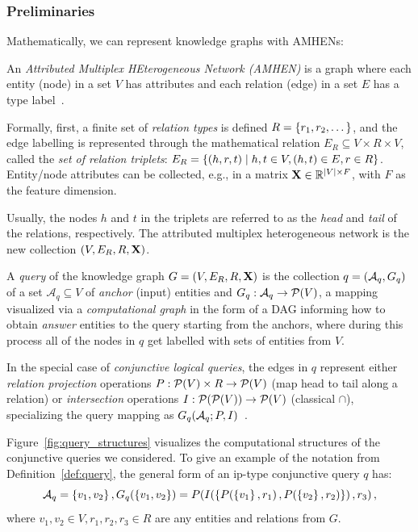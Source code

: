 \subsubsection{Preliminaries}

Mathematically, we can represent knowledge graphs with AMHENs:
\begin{definition}
An \emph{Attributed Multiplex HEterogeneous Network (AMHEN)} is a graph where each entity (node) in a set $V$ has attributes and each relation (edge) in a set $E$ has a type label~\cite{liu_ahng_2019,cen_representation_2019}. 

Formally, first, a finite set of \emph{relation types} is defined $R = \mathopen{}\left\{r_1,r_2,\dots\right\}$, and the edge labelling is represented through the mathematical relation $E_R \subseteq V \times R \times V$, called the \emph{set of relation triplets}:  $E_R = \mathopen{}\left\{\mathopen{}\left(h,r,t\right) \mid h,t \in V, \mathopen{}\left(h,t\right) \in E, r \in R\right\}$. Entity/node attributes can be collected, e.g., in a matrix $\mathbf{X} \in \mathbb{R}^{\mathopen{}\left|V\right| \times F}$, with $F$ as the feature dimension. 

Usually, the nodes $h$ and $t$ in the triplets are referred to as the \emph{head} and \emph{tail} of the relations, respectively. The attributed multiplex heterogeneous network is the new collection $\mathopen{}\left(V, E_R, R, \mathbf{X}\right)$.
\end{definition}

\begin{definition}
    A \emph{query} of the knowledge graph $G=\mathopen{}\left(V, E_R, R, \mathbf{X}\right)$ is the collection $q=\mathopen{}\left(\mathcal{A}_q, G_q\right)$ of a set $\mathcal{A}_q \subseteq V$ of \emph{anchor} (input) entities and $G_q: \mathcal{A}_q \to \mathcal{P}\mathopen{}\left(V\right)$, a mapping visualized via a \emph{computational graph} in the form of a DAG informing how to obtain \emph{answer} entities to the query starting from the anchors, where during this process all of the nodes in $q$ get labelled with sets of entities from $V$. 
    
    In the special case of \emph{conjunctive logical queries}, the edges in $q$ represent either \emph{relation projection} operations $P: \mathcal{P}\mathopen{}\left(V\right) \times R \to \mathcal{P}\mathopen{}\left(V\right)$ (map head to tail along a relation) or \emph{intersection} operations $I: \mathcal{P}\mathopen{}\left(\mathcal{P}\mathopen{}\left(V\right)\right) \to \mathcal{P}\mathopen{}\left(V\right)$ (classical $\cap$), specializing the query mapping as $G_q\mathopen{}\left(\mathcal{A}_q;P,I\right)$~\cite{ren_query2box_2020}.
    \label{def:query}
\end{definition}
Figure~\ref{fig:query_structures} visualizes the computational structures of the conjunctive queries we considered. To give an example of the notation from Definition~\ref{def:query}, the general form of an ip-type conjunctive query $q$ has: 
\begin{equation}
    \mathcal{A}_q=\mathopen{}\left\{v_1,v_2\right\}, G_q\mathopen{}\left(\mathopen{}\left\{v_1,v_2\right\}\right)=P\mathopen{}\left(I\mathopen{}\left(\mathopen{}\left\{P\mathopen{}\left(\mathopen{}\left\{v_1\right\},r_1\right),P\mathopen{}\left(\mathopen{}\left\{v_2\right\},r_2\right)\right\}\right),r_3\right),
\end{equation}
where $v_1,v_2 \in V, r_1,r_2,r_3 \in R$ are any entities and relations from $G$.

